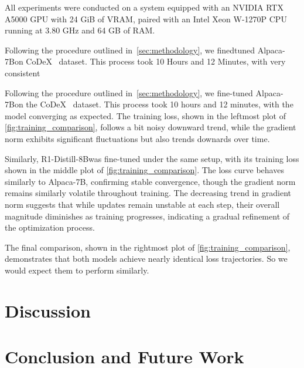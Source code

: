 \documentclass[12pt,a4paper]{article}
\newcommand{\modelalpaca}{Alpaca-7B}
\newcommand{\modeldeepseek}{R1-Distill-8B}
\begin{document}
All experiments were conducted on a system equipped with an NVIDIA RTX A5000 GPU with 24 GiB of VRAM, paired with an Intel Xeon W-1270P CPU running at 3.80 GHz and 64 GB of RAM.


Following the procedure outlined in~\cref{sec:methodology}, we finedtuned \modelalpaca on CoDeX~\cite{safavi2020codex} dataset.
This process took 10 Hours and 12 Minutes, with very consistent

Following the procedure outlined in~\cref{sec:methodology}, we fine-tuned \modelalpaca on the CoDeX~\cite{safavi2020codex} dataset.
This process took 10 hours and 12 minutes, with the model converging as expected.
The training loss, shown in the leftmost plot of \cref{fig:training_comparison}, follows a bit noisy downward trend, while the gradient norm exhibits significant fluctuations but also trends downards over time.

Similarly, \modeldeepseek was fine-tuned under the same setup, with its training loss shown in the middle plot of \cref{fig:training_comparison}. The loss curve behaves similarly to \modelalpaca, confirming stable convergence, though the gradient norm remains similarly volatile throughout training.
The decreasing trend in gradient norm suggests that while updates remain unstable at each step, their overall magnitude diminishes as training progresses, indicating a gradual refinement of the optimization process.

The final comparison, shown in the rightmost plot of \cref{fig:training_comparison}, demonstrates that both models achieve nearly identical loss trajectories.
So we would expect them to perform similarly.



%
%

\section{Discussion}\label{sec:discussion}


%
%

\section{Conclusion and Future Work}\label{sec:conclusion-and-future-work}


\end{document}
